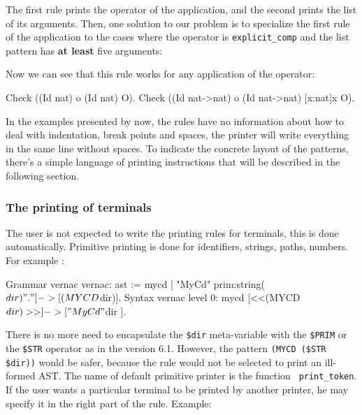 The first rule prints the operator of the application, and the second
prints the list of its arguments. Then, one solution to our problem is
to specialize the first rule of the application to the cases where the
operator is \verb+explicit_comp+ and the list pattern has {\bf at
least} five arguments:


Now we can see that this rule works for any application of the
operator:

\begin{coq_example}
Check ((Id nat) o (Id nat) O).
Check ((Id nat->nat) o (Id nat->nat) [x:nat]x O).
\end{coq_example}

In the examples presented by now, the rules have no information about
how to deal with indentation, break points and spaces, the printer
will write everything in the same line without spaces. To indicate the
concrete layout of the patterns, there's a simple language of printing
instructions that will be described in the following section.


\subsubsection{The printing of terminals}
The user is not expected to write the printing rules for terminals,
this is done automatically.  Primitive printing is done for
identifiers, strings, paths, numbers. For example : 

\begin{coq_example*}
Grammar vernac vernac: ast :=
  mycd [ "MyCd" prim:string($dir) "." ] -> [(MYCD $dir)].
Syntax vernac level 0:
  mycd [<<(MYCD $dir)>>] -> [ "MyCd " $dir ].
\end{coq_example*}

There is no more need to encapsulate the \verb+$dir+ meta-variable
with the \verb+$PRIM+ or the \verb+$STR+ operator as in the version
6.1. However, the pattern \verb+(MYCD ($STR $dir))+ would be safer,
because the rule would not be selected to print an ill-formed AST. The
name of default primitive printer is the {\ocaml} function {\tt
print\_token}. If the user wants a particular terminal to be printed
by another printer, he may specify it in the right part of the
rule. Example:

